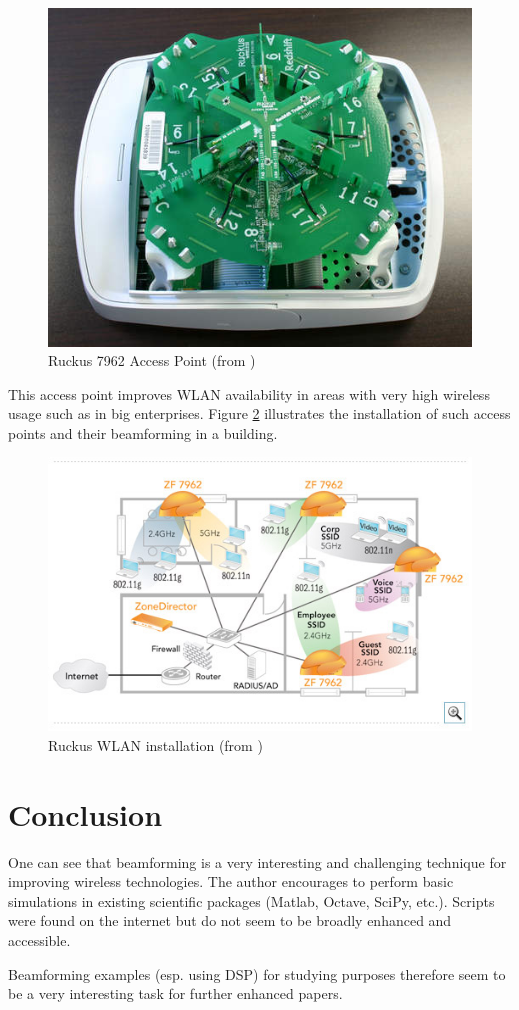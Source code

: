 \begin{figure}[!h]
\centering
\includegraphics{figures/ruckus_7962.jpg}\caption{\label{fig:ruckus}Ruckus 7962 Access Point (from \cite{tomshardware})}
\end{figure}

This access point improves WLAN availability in areas with very high wireless usage such as in big enterprises. Figure \ref{fig:ruckus_wlan} illustrates the installation of such access points and their beamforming in a building.

\begin{figure}[!h]
\centering
\includegraphics[scale=0.8]{figures/ruckus_wlan.jpg}\caption{\label{fig:ruckus_wlan}Ruckus WLAN installation (from \cite{ruckus})}
\end{figure}

\clearpage
\section{Conclusion}
One can see that beamforming is a very interesting and challenging technique for improving wireless technologies. The author encourages to perform basic simulations in existing scientific packages (Matlab, Octave, SciPy, etc.). Scripts were found on the internet but do not seem to be broadly enhanced and accessible.

Beamforming examples (esp. using DSP) for studying purposes therefore seem to be a very interesting task for further enhanced papers.
